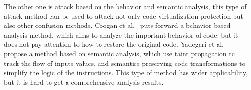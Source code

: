 The other one is attack based on the behavior and semantic analysis, this type of attack method can be used to attack not only code virtualization protection but also other confusion methods.
Coogan et al.~\cite{coogan2011deobfuscation} puts forward a behavior based analysis method, which aims to analyze the important behavior of code, but it does not pay attention to how to restore the original code. %
Yadegari et al.~\cite{Yadegari2015A} propose a method based on semantic analysis, which use taint propagation to track the flow of inputs values, and semantics-preserving code transformations to simplify the logic of the instructions.
This type of method has wider applicability, but it is hard to get a comprehensive analysis results.
